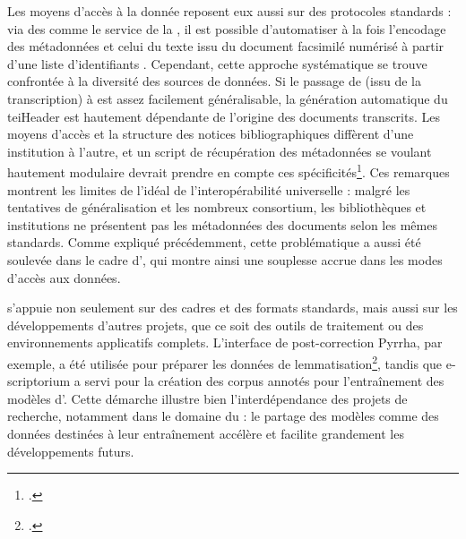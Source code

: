 Les moyens d'accès à la donnée reposent eux aussi sur des protocoles standards : via des \api comme le service \sru de la \bnf, il est possible d'automatiser à la fois l'encodage des métadonnées et celui du texte issu du document facsimilé numérisé à partir d'une 
liste d'identifiants \ark. Cependant, cette approche systématique se trouve confrontée à la diversité des sources de données. Si le passage de \alto (issu de la transcription) à \tei est assez facilement généralisable, la génération automatique du
teiHeader est hautement dépendante de l'origine des documents transcrits. Les
moyens d'accès et la structure des notices bibliographiques diffèrent d'une institution à
l'autre, et un script de récupération des métadonnées se voulant hautement modulaire devrait prendre en compte ces spécificités\footcite[p.117]{kristensen_dalto_2022}. Ces remarques montrent les limites de l'idéal de l'interopérabilité universelle : malgré les tentatives de généralisation
et les nombreux consortium, les bibliothèques et institutions ne
présentent pas les métadonnées des documents selon les mêmes standards. Comme expliqué précédemment, cette problématique a aussi été soulevée dans le cadre d'\eida, qui montre ainsi une souplesse accrue dans les modes d'accès aux données.  

\gaga s'appuie non seulement sur des cadres et des formats standards, mais aussi sur les développements d'autres projets, que ce soit des outils de traitement ou des environnements applicatifs complets. L'interface de post-correction Pyrrha, par exemple, a été utilisée pour préparer les données de lemmatisation\footcite{sagot_gallicorpor_2022}, tandis que e-scriptorium a servi pour la création des corpus annotés pour l'entraînement des modèles d'\htr. Cette
démarche illustre bien l'interdépendance des projets de recherche, notamment dans le domaine du \ml : le partage des modèles comme des données destinées à leur entraînement accélère et facilite grandement les développements futurs.